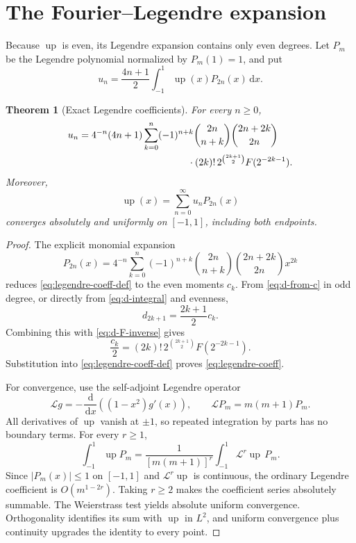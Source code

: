 \documentclass[11pt]{article}
\numberwithin{equation}{section}
\newtheorem{theorem}{Theorem}[section]
\theoremstyle{definition}
\theoremstyle{remark}
\newcommand{\dd}{\,\mathrm{d}}
\newcommand{\upf}{\operatorname{up}}
\begin{document}
\section{The Fourier--Legendre expansion}\label{sec:legendre}

Because $\upf$ is even, its Legendre expansion contains only even degrees.
Let $P_m$ be the Legendre polynomial normalized by $P_m(1)=1$, and put
\begin{equation}\label{eq:legendre-coeff-def}
 u_n=\frac{4n+1}{2}\int_{-1}^{1}\upf(x)P_{2n}(x)\dd x.
\end{equation}

\begin{theorem}[Exact Legendre coefficients]\label{thm:legendre-coeff}
For every $n\ge0$,
\begin{equation}\label{eq:legendre-coeff}
 \begin{split}
 u_n={}&4^{-n}(4n+1)
 \sum_{k=0}^{n}(-1)^{n+k}
 \binom{2n}{n+k}\binom{2n+2k}{2n}\\
 &\hspace{35mm}\cdot(2k)!\,
 2^{\binom{2k+1}{2}}F(2^{-2k-1}).
 \end{split}
\end{equation}
Moreover,
\begin{equation}\label{eq:legendre-series}
 \upf(x)=\sum_{n=0}^{\infty}u_nP_{2n}(x)
\end{equation}
converges absolutely and uniformly on $[-1,1]$, including both endpoints.
\end{theorem}

\begin{proof}
The explicit monomial expansion
\begin{equation}\label{eq:P-even-monomial}
 P_{2n}(x)=4^{-n}\sum_{k=0}^{n}(-1)^{n+k}
 \binom{2n}{n+k}\binom{2n+2k}{2n}x^{2k}
\end{equation}
reduces \eqref{eq:legendre-coeff-def} to the even moments $c_k$.
From \eqref{eq:d-from-c} in odd degree, or directly from
\eqref{eq:d-integral} and evenness,
\[
 d_{2k+1}=\frac{2k+1}{2}c_k.
\]
Combining this with \eqref{eq:d-F-inverse} gives
\begin{equation}\label{eq:c-inverse-power}
 \frac{c_k}{2}=(2k)!\,2^{\binom{2k+1}{2}}F(2^{-2k-1}).
\end{equation}
Substitution into \eqref{eq:legendre-coeff-def} proves
\eqref{eq:legendre-coeff}.

For convergence, use the self-adjoint Legendre operator
\[
 \mathcal Lg=-\frac{\dd}{\dd x}\left((1-x^2)g'(x)\right),
 \qquad \mathcal LP_m=m(m+1)P_m.
\]
All derivatives of $\upf$ vanish at $\pm1$, so repeated integration by parts
has no boundary terms.  For every $r\ge1$,
\[
 \int_{-1}^{1}\upf P_m
 =\frac{1}{[m(m+1)]^r}
  \int_{-1}^{1}\mathcal L^r\upf\,P_m.
\]
Since $|P_m(x)|\le1$ on $[-1,1]$ and $\mathcal L^r\upf$ is continuous,
the ordinary Legendre coefficient is $O(m^{1-2r})$.  Taking $r\ge2$ makes
the coefficient series absolutely summable.  The Weierstrass test yields
absolute uniform convergence.  Orthogonality identifies its sum with
$\upf$ in $L^2$, and uniform convergence plus continuity upgrades the
identity to every point.
\end{proof}
\end{document}
